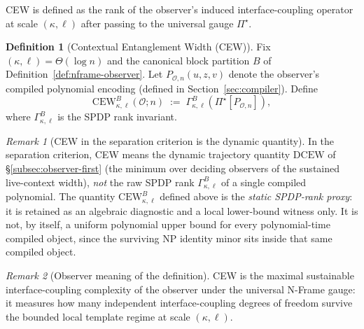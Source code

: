 \documentclass[12pt]{article}
\theoremstyle{definition}
\newtheorem{definition}{Definition}
\theoremstyle{definition}
\theoremstyle{remark}
\newtheorem{remark}{Remark}
\theoremstyle{remark}
\begin{document}
CEW is defined as the rank of the observer's induced interface-coupling operator at scale
$(\kappa,\ell)$ after passing to the universal gauge $\Pi^\star$.

\begin{definition}[Contextual Entanglement Width (CEW)]
\label{def:cew-intrinsic}
Fix $(\kappa,\ell)=\Theta(\log n)$ and the canonical block partition $B$ of
Definition~\ref{def:nframe-observer}.  Let $P_{\mathcal{O},n}(u,z,v)$ denote the
observer's compiled polynomial encoding (defined in Section~\ref{sec:compiler}).
Define
\[
\mathrm{CEW}^{B}_{\kappa,\ell}(\mathcal{O};n)
\;:=\;
\Gamma^{B}_{\kappa,\ell}\!\left(\Pi^\star\!\left[P_{\mathcal{O},n}\right]\right),
\]
where $\Gamma^{B}_{\kappa,\ell}$ is the SPDP rank invariant.
\end{definition}

\begin{remark}[CEW in the separation criterion is the dynamic quantity]
In the separation criterion, CEW means the dynamic trajectory quantity $\mathrm{DCEW}$ of \S\ref{subsec:observer-first} (the minimum over deciding observers of the sustained live-context width), \emph{not} the raw SPDP rank $\Gamma^{B}_{\kappa,\ell}$ of a single compiled polynomial.  The quantity $\mathrm{CEW}^{B}_{\kappa,\ell}$ defined above is the \emph{static SPDP-rank proxy}: it is retained as an algebraic diagnostic and a local lower-bound witness only.  It is not, by itself, a uniform polynomial upper bound for every polynomial-time compiled object, since the surviving NP identity minor sits inside that same compiled object.
\end{remark}

\begin{remark}[Observer meaning of the definition]
CEW is the maximal sustainable interface-coupling complexity of the observer under the
universal N-Frame gauge: it measures how many independent interface-coupling degrees of
freedom survive the bounded local template regime at scale $(\kappa,\ell)$.
\end{remark}
\end{document}
